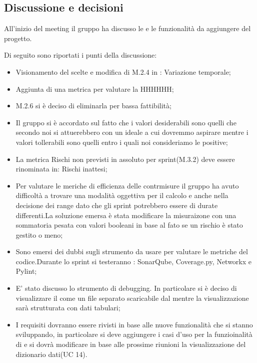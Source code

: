 \subsection{Discussione e decisioni}
\par All'inizio del meeting il gruppo ha discusso le  e le funzionalità da aggiungere del progetto.
\par Di seguito sono riportati i punti della discussione:
\begin{itemize}
	\item Visionamento del  scelte e modifica di M.2.4 in : Variazione temporale;
	\item Aggiunta di una metrica per valutare la HHHHHH;
	\item M.2.6 si è deciso di eliminarla per bassa fattibilità;
	\item Il gruppo si è accordato sul fatto che i valori desiderabili sono quelli che secondo noi si attuerebbero con un  ideale a cui dovremmo aspirare mentre i valori tollerabili sono quelli entro i quali noi consideriamo le  positive;
	\item La metrica Rischi non previsti in assoluto per sprint(M.3.2) deve essere rinominata in: Rischi inattesi;
	\item Per valutare le meriche di efficienza delle contrmisure il gruppo ha avuto difficoltà a trovare una modalità oggettiva per il calcolo e anche nella decisione dei range dato che gli sprint potrebbero essere di durate differenti.La soluzione emersa è stata modificare la misuraizone con una sommatoria pesata con valori booleani in base al fato se un rischio è stato gestito o meno;
	\item Sono emersi dei dubbi sugli strumento da usare per valutare le metriche del codice.Durante lo sprint si testeranno : SonarQube, Coverage.py, Networkx e Pylint;
	\item E' stato discusso lo strumento di debugging. In particolare si è deciso di visualizzare il  come un file separato scaricabile dal  mentre la visualizzazione sarà strutturata con dati tabulari;
	\item I requisiti dovranno essere rivisti in base alle nuove funzionalità che si stanno sviluppando, in particolare si deve aggiungere i casi d'uso per la funzioinalità di  e si dovrà modificare in base alle prossime riunioni la visualizzazione del dizionario dati(UC 14).
\end{itemize}

